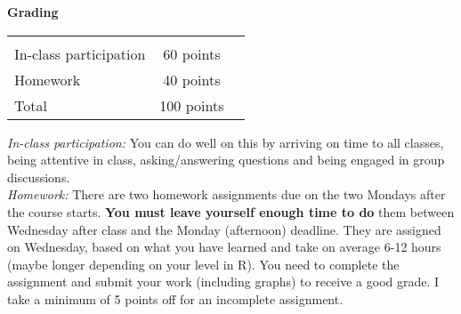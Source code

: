 \documentclass[11pt]{article}
\begin{document}
\begin{large} 
{\raggedright \textbf{Grading}}
\end{large}

\begin{tabular}{lcr}
& & \\ [-12pt]
In-class participation & \hspace{14pt} 60 points\\ 
Homework & \hspace{14pt} 40 points \\
Total & \hspace{14pt} 100 points
\end{tabular}

\vspace{5ex}
\noindent \emph{In-class participation:} You can do well on this by arriving on time to all classes, being attentive in class, asking/answering questions and being engaged in group discussions. \\

\noindent \emph{Homework:} There are two homework assignments due on the two Mondays after the course starts. {\bf You must leave yourself enough time to do} them between Wednesday after class and the Monday (afternoon) deadline. They are assigned on Wednesday, based on what you have learned and take on average 6-12 hours (maybe longer depending on your level in R). You need to complete the assignment and submit your work (including graphs) to receive a good grade. I take a minimum of 5 points off for an incomplete assignment. 
\end{document}

